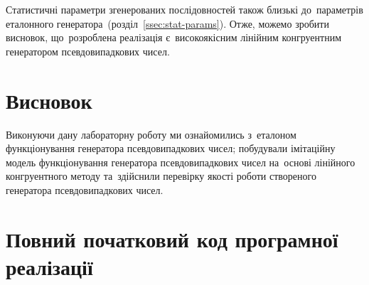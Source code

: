 \documentclass[
	a4paper,
	oneside,
	BCOR = 10mm,
	DIV = 12,
	12pt,
	headings = normal,
]{scrartcl}
\begin{document}
			Статистичні параметри згенерованих послідовностей також близькі до~параметрів еталонного генератора~(розділ~\ref{ssec:stat-params}). Отже, можемо зробити висновок, що~розроблена реалізація є~високоякісним лінійним конгруентним генератором псевдовипадкових чисел. 


	\section{Висновок}
		Виконуючи дану лабораторну роботу ми ознайомились з~еталоном функціонування генератора псевдовипадкових чисел; побудували імітаційну модель функціонування генератора псевдовипадкових чисел на~основі лінійного конгруентного методу та~здійснили перевірку якості роботи створеного генератора псевдовипадкових чисел.

		\appendix
		\section{Повний початковий код програмної реалізації}
		\label{sec:full-listing}
\end{document}
